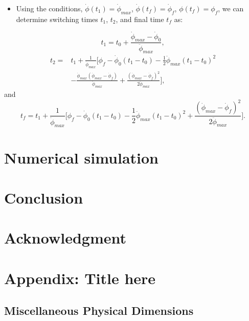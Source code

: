 \documentclass[letterpaper, preprint, paper,11pt]{AAS}	%
\begin{document}
			\begin{itemize}
				\item Using the conditions, $\dot{\phi}(t_1)=\dot{\phi}_{max}$, $\dot{\phi}(t_f)=\dot{\phi}_f$, $\phi(t_f)=\phi_f$, we can determine switching times $t_1$, $t_2$, and final time $t_f$ as:
			\end{itemize}
			\begin{equation}\label{t1cons}
			t_1=t_0+\frac{\dot{\phi}_{max}-\dot{\phi}_0}{\ddot{\phi}_{max}},
			\end{equation}
			\begin{equation}\label{t2cons}
			\begin{split}
			t_2=&t_1+\frac{1}{\dot{\phi}_{max}}\Big[ \phi_f-\dot{\phi}_0(t_1-t_0)-\frac{1}{2}\ddot{\phi}_{max}(t_1-t_0)^2\\
			&-\frac{\dot{\phi}_{max}(\dot{\phi}_{max}-\dot{\phi}_f)}{\ddot{\phi}_{max}}+\frac{(\dot{\phi}_{max}-\dot{\phi}_f)^2}{2\ddot{\phi}_{max}} \Big],
			\end{split}
			\end{equation}
			and
			\begin{equation}\label{tfcons}
			t_f=t_1+\frac{1}{\dot{\phi}_{max}}\Big[ \phi_f-\dot{\phi}_0(t_1-t_0)-\frac{1}{2}\ddot{\phi}_{max}(t_1-t_0)^2+\frac{(\dot{\phi}_{max}-\dot{\phi}_f)^2}{2\ddot{\phi}_{max}} \Big].
			\end{equation}
	
\section{Numerical simulation} 

\section{Conclusion}

\section{Acknowledgment}

\appendix
\section*{Appendix: Title here}

\subsection*{Miscellaneous Physical Dimensions}

\end{document}
